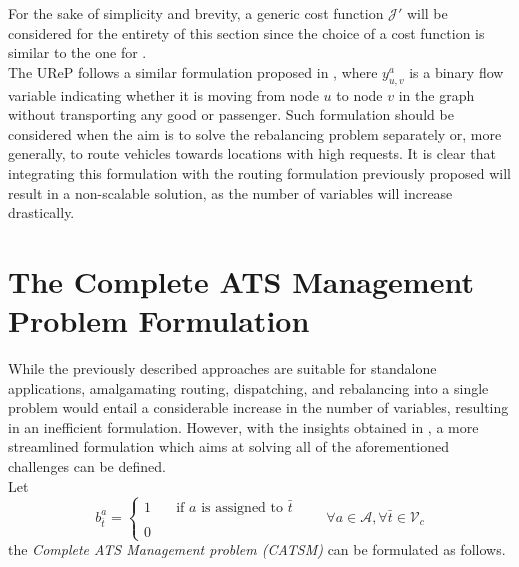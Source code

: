 For the sake of simplicity and brevity, a generic cost function $\mathcal{J'}$ will be considered for the entirety of this section since the choice of a cost function is similar to the one for .  \\
The UReP follows a similar formulation proposed in , where $y_{u,v}^a$ is a binary flow variable indicating whether it is moving from node $u$ to node $v$ in the graph without transporting any good or passenger. Such formulation should be considered when the aim is to solve the rebalancing problem separately or, more generally, to route vehicles towards locations with high requests. It is clear that integrating this formulation with the routing formulation previously proposed will result in a non-scalable solution, as the number of variables will increase drastically.
%
\section{The Complete ATS Management Problem Formulation}\label{sec:catsm}
While the previously described approaches are suitable for standalone applications, amalgamating routing, dispatching, and rebalancing into a single problem would entail a considerable increase in the number of variables, resulting in an inefficient formulation. However, with the insights obtained in , a more streamlined formulation which aims at solving all of the aforementioned challenges can be defined. \\
Let 
\begin{equation*}
	b_{\bar{t}}^a = 
	\begin{cases} 
		1 & \quad \text{if $a$ is assigned to }\bar{t} \\
		\\
		0
	\end{cases}
	\quad\quad \forall a \in \mathcal{A}, \forall \bar{t} \in \mathcal{V}_c
	\label{eq:assignment}
\end{equation*}
the \textit{Complete ATS Management problem (CATSM)} can be formulated as follows. \\


